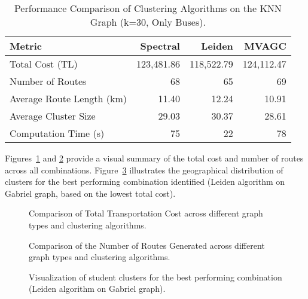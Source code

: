 \begin{table}[h]
\centering
\label{tab:knn_results}
\begin{tabular}{lrrr}
\toprule
Metric & Spectral & Leiden & MVAGC \\
\midrule
Total Cost (TL) & 123,481.86 & 118,522.79 & 124,112.47 \\
Number of Routes & 68 & 65 & 69 \\
Average Route Length (km) & 11.40 & 12.24 & 10.91 \\
Average Cluster Size & 29.03 & 30.37 & 28.61 \\
Computation Time (s) & 75 & 22 & 78 \\
\bottomrule
\end{tabular}
\caption{Performance Comparison of Clustering Algorithms on the KNN Graph (k=30, Only Buses).}
\end{table}

Figures~\ref{fig:cost_comparison} and \ref{fig:routes_comparison} provide a visual summary of the total cost and number of routes across all combinations. Figure~\ref{fig:best_clustering_viz} illustrates the geographical distribution of clusters for the best performing combination identified (Leiden algorithm on Gabriel graph, based on the lowest total cost).

\begin{figure}[h]
    \centering
    \caption{Comparison of Total Transportation Cost across different graph types and clustering algorithms.}
    \label{fig:cost_comparison}
\end{figure}

\begin{figure}[h]
    \centering
    \caption{Comparison of the Number of Routes Generated across different graph types and clustering algorithms.}
    \label{fig:routes_comparison}
\end{figure}

\begin{figure}[h]
    \centering
    \caption{Visualization of student clusters for the best performing combination (Leiden algorithm on Gabriel graph).}
    \label{fig:best_clustering_viz}
\end{figure}

